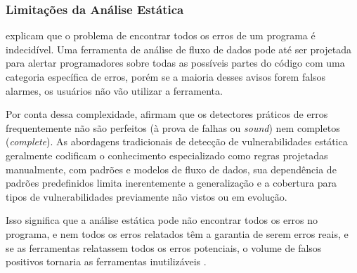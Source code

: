 \documentclass[
    12pt,                %
    openright,           %
    oneside,             %
    a4paper,             %
    english,             %
    brazil               %
]{abntex2}
\begin{document}
\subsubsection{Limitações da Análise Estática}
\label{sec:limitacoesanalise}
\par
{} explicam que o problema de encontrar todos os erros de um programa é indecidível.
Uma ferramenta de análise de fluxo de dados pode até ser projetada para alertar programadores sobre todas as possíveis partes do código com uma categoria específica de erros, porém se a maioria desses avisos forem falsos alarmes, os usuários não vão utilizar a ferramenta.
\par
Por conta dessa complexidade,  afirmam que os detectores práticos de erros frequentemente não são perfeitos (à prova de falhas ou \textit{sound}) nem completos (\textit{complete}).
As abordagens tradicionais de detecção de vulnerabilidades estática geralmente codificam o conhecimento especializado como regras projetadas manualmente, com padrões e modelos de fluxo de dados, sua dependência de padrões predefinidos limita inerentemente a generalização e a cobertura para tipos de vulnerabilidades previamente não vistos ou em evolução.
\par
Isso significa que a análise estática pode não encontrar todos os erros no programa, e nem todos os erros relatados têm a garantia de serem erros reais, e se as ferramentas relatassem todos os erros potenciais, o volume de falsos positivos tornaria as ferramentas inutilizáveis \cite{aho2007compilers}.
\end{document}
